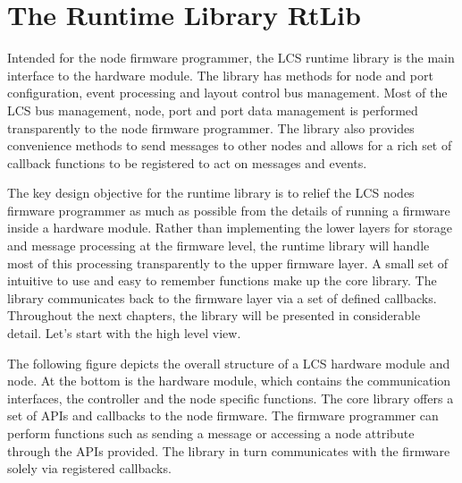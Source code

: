 \chapter{The Runtime Library RtLib}

Intended for the node firmware programmer, the LCS runtime library is the main interface to the hardware module. The library has methods for node and port configuration, event processing and layout control bus management. Most of the LCS bus management, node, port and port data management is performed transparently to the node firmware programmer. The library also provides convenience methods to send messages to other nodes and allows for a rich set of callback functions to be registered to act on messages and events.

The key design objective for the runtime library is to relief the LCS nodes firmware programmer as much as possible from the details of running a firmware inside a hardware module. Rather than implementing the lower layers for storage and message processing at the firmware level, the runtime library will handle most of this processing transparently to the upper firmware layer. A small set of intuitive to use and easy to remember functions make up the core library. The library communicates back to the firmware layer via a set of defined callbacks. Throughout the next chapters, the library will be presented in considerable detail. Let's start with the high level view.

The following figure depicts the overall structure of a LCS hardware module and node. At the bottom is the hardware module, which contains the communication interfaces, the controller and the node specific functions. The core library offers a set of APIs and callbacks to the node firmware. The firmware programmer can perform functions such as sending a message or accessing a node attribute through the APIs provided. The library in turn communicates with the firmware solely via registered callbacks.

